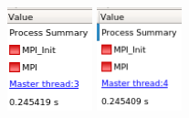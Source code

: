 \documentclass[12pt]{article}
\begin{document}
\begin{sloppypar}
\begin{figure}[ht]
\begin{minipage}[t]{0.12\textwidth}
        \includegraphics[width=\textwidth]{res/init-phase-p3.PNG}
    \end{minipage}
    \begin{minipage}[t]{0.12\textwidth}
        \includegraphics[width=\textwidth]{res/init-phase-p4.PNG}

\end{minipage}
\end{figure}
\end{sloppypar}
\end{document}
